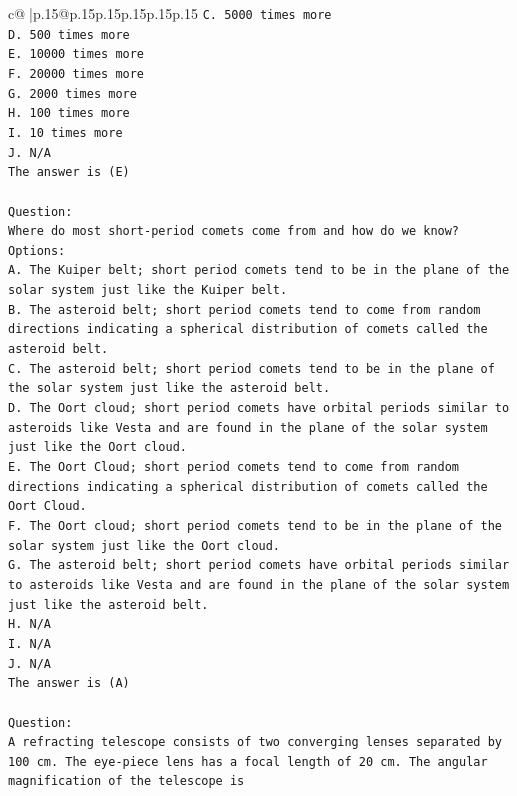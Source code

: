 \documentclass{article}
\begin{document}
{\begin{supertabular}{c@{$\;$}|p{.15\linewidth}@{}p{.15\linewidth}p{.15\linewidth}p{.15\linewidth}p{.15\linewidth}p{.15\linewidth}}
{{{\texttt{C. 5000 times more} \\
\texttt{D. 500 times more} \\
\texttt{E. 10000 times more} \\
\texttt{F. 20000 times more} \\
\texttt{G. 2000 times more} \\
\texttt{H. 100 times more} \\
\texttt{I. 10 times more} \\
\texttt{J. N/A} \\
\texttt{The answer is (E)} \\
\\ 
\texttt{Question:} \\
\texttt{Where do most short{-}period comets come from and how do we know?} \\
\texttt{Options:} \\
\texttt{A. The Kuiper belt; short period comets tend to be in the plane of the solar system just like the Kuiper belt.} \\
\texttt{B. The asteroid belt; short period comets tend to come from random directions indicating a spherical distribution of comets called the asteroid belt.} \\
\texttt{C. The asteroid belt; short period comets tend to be in the plane of the solar system just like the asteroid belt.} \\
\texttt{D. The Oort cloud; short period comets have orbital periods similar to asteroids like Vesta and are found in the plane of the solar system just like the Oort cloud.} \\
\texttt{E. The Oort Cloud; short period comets tend to come from random directions indicating a spherical distribution of comets called the Oort Cloud.} \\
\texttt{F. The Oort cloud; short period comets tend to be in the plane of the solar system just like the Oort cloud.} \\
\texttt{G. The asteroid belt; short period comets have orbital periods similar to asteroids like Vesta and are found in the plane of the solar system just like the asteroid belt.} \\
\texttt{H. N/A} \\
\texttt{I. N/A} \\
\texttt{J. N/A} \\
\texttt{The answer is (A)} \\
\\ 
\texttt{Question:} \\
\texttt{A refracting telescope consists of two converging lenses separated by 100 cm. The eye{-}piece lens has a focal length of 20 cm. The angular magnification of the telescope is} \\
}}}
\end{supertabular}}
\end{document}
